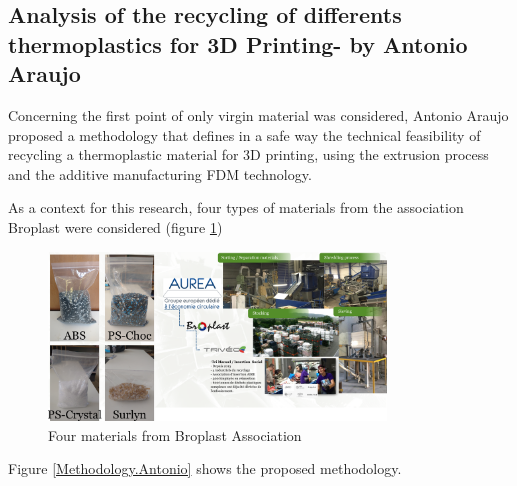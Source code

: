 \subsection{Analysis of the recycling of differents thermoplastics for 3D Printing- by Antonio Araujo}

Concerning the first point of only virgin material was considered, Antonio Araujo proposed a methodology that defines in a safe way the technical feasibility of recycling a thermoplastic material for 3D printing, using the extrusion process and the additive manufacturing FDM technology.

As a context for this research, four types of materials from the association Broplast were considered (figure \ref{Context.Antonio})

\begin{figure}[H]
	\centering
	\includegraphics[width=0.8\textwidth]{Figures/Antonio/Context.png}
	\caption{Four materials from Broplast Association}
	\label{Context.Antonio}
\end{figure}


Figure \ref{Methodology.Antonio} shows the proposed methodology.

